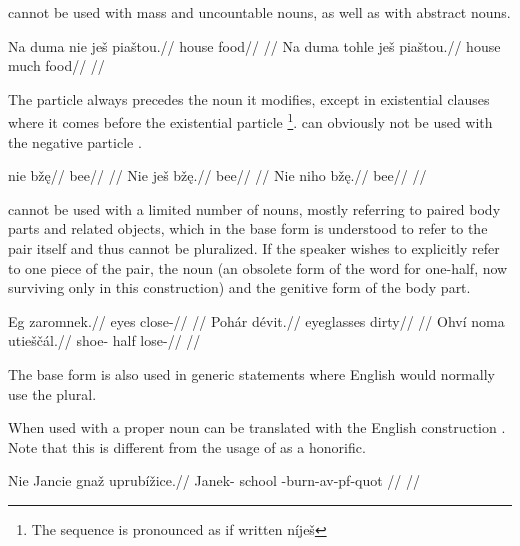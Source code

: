  cannot be used with mass and uncountable nouns, as well as with abstract nouns.

\pex
\a
\begingl
\gla *Na duma nie ješ piaštou.//
\glb {} house   food//
\glft {}//
\endgl
\a
\begingl
\gla Na duma tohle ješ piaštou.//
\glb {} house much  food//
\glft {}//
\endgl
\xe

The particle  always precedes the noun it modifies, except in existential clauses where it comes before the existential particle \footnote{The sequence is pronounced as if written níješ }.  can obviously not be used with the negative particle .

\pex
\a
\begingl
\gla nie bž\k{e}//
\glb {} bee//
\glft {}//
\endgl
\a
\begingl
\gla Nie ješ bž\k{e}.//
\glb {}  bee//
\glft {}//
\endgl
\a
\begingl
\gla *Nie niho bž\k{e}.//
\glb {}  bee//
\glft {}//
\endgl
\xe

 cannot be used with a limited number of nouns, mostly referring to paired body parts and related objects, which in the base form is understood to refer to the pair itself and thus cannot be pluralized. If the speaker wishes to explicitly refer to one piece of the pair, the noun  (an obsolete form of the word for one-half, now surviving only in this construction) and the genitive form of the body part.

\pex
\begingl
\gla Eg zaromnek.//
\glb eyes close-//
\glft {}//
\endgl
\xe
\pex
\begingl
\gla Pohár dévit.//
\glb eyeglasses dirty//
\glft {}//
\endgl
\xe
\pex
\begingl
\gla Ohví noma utieščál.//
\glb shoe- half lose-//
\glft {}//
\endgl
\xe

The base form is also used in generic statements where English would normally use the plural.


When used with a proper noun  can be translated with the English construction . Note that this is different from the usage of  as a honorific.

\pex
\begingl
    \gla Nie Jancie gnaž uprubížice.//
    \glb {} Janek- school -burn-{av-pf-quot} //
    \glft {}//
\endgl
\xe

